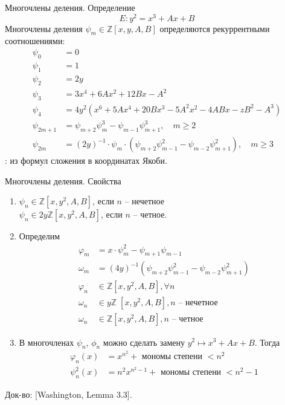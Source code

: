 \documentclass{beamer}
\begin{document}
\begin{frame}{Многочлены деления. Определение}
\[E: y^2 = x^3 + A x + B \]
Многочлены деления ${\psi _m} \in \mathbb{Z}[ {x,y,A,B}]$ определяются рекуррентными соотношениями:
\begin{align*}
    {\psi _0} &= 0 \\
    {\psi _1} &= 1 \\
    {\psi _2} &= 2y \\
    {\psi _3} &= 3{x^4} + 6A{x^2} + 12Bx - {A^2} \\
    {\psi _4} &= 4{y^2}\left( {{x^6} + 5A{x^4} + 20B{x^3} - 5{A^2}{x^2} - 4ABx - z{B^2} - {A^3}} \right) \\
    {\psi _{2m + 1}} &= {\psi _{m + 2}}\psi _m^3 - {\psi _{m - 1}}\psi _{m + 1}^3, \quad m \geqslant 2 \\
    {\psi _{2m}} &= {\left( {2y} \right)^{ - 1}} \cdot {\psi _m} \cdot \left( {{\psi _{m + 2}}\psi _{m - 1}^2 - {\psi _{m - 2}}\psi _{m + 1}^2} \right),\quad m \geqslant 3
\end{align*}
: из формул сложения в координатах Якоби.
\end{frame}



\begin{frame}{Многочлены деления. Свойства}
\begin{enumerate}
    \item 
    ${\psi _n} \in \mathbb{Z}[x, y^2, A, B]$, если $n$ -- нечетное \\
    ${\psi _n} \in 2y\mathbb{Z}[x, y^2, A, B]$, если $n$ -- четное. 
    \item Определим
    \begin{align*}
        {\varphi _m} &= x \cdot \psi _m^2 - {\psi _{m + 1}}{\psi _{m - 1}} \\
        {\omega _m} &= {\left( {4y} \right)^{ - 1}}\left( {{\psi _{m + 2}}\psi _{m - 1}^2 - {\psi _{m - 2}}\psi _{m + 1}^2} \right) \\
        {\varphi _n} &\in \mathbb{Z}\left[ {x, {y^2},A,B} \right], \forall n \\
        {\omega _n} &\in y\mathbb{Z}\;\left[ {x, {y^2},A,B} \right], n{\text{  --  нечетное}} \\
        {\omega _n} &\in \mathbb{Z}\left[ {x, {y^2},A,B} \right],n{\text{ -- четное}}
    \end{align*}
    
    
    \item В многочленах ${\psi _n}$, ${\phi _n}$ можно сделать замену ${y^2} \mapsto {x^3} + Ax + B$. %
    Тогда 
    \begin{align*}
        {\varphi _n}\left( x \right) &= {x^{{n^2}}} + {\text{ мономы степени }} < {n^2} \\
        \psi _n^2\left( x \right) &= {n^2}{x^{{n^2} - 1}} + {\text{ мономы степени }} < {n^2} - 1
    \end{align*}
\end{enumerate}
Док-во: [Washington, Lemma 3.3].
\end{frame}
\end{document}
